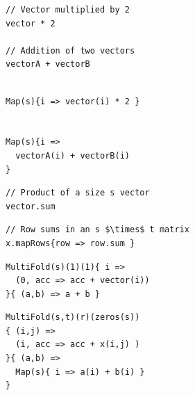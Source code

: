 \begin{figure}
\centering

\newsavebox{\MapHLL}
\begin{lrbox}{\MapHLL}
\begin{lstlisting}[language=PPLTable]
// Vector multiplied by 2
vector * 2

// Addition of two vectors
vectorA + vectorB
\end{lstlisting}
\end{lrbox}

\newsavebox{\MapPPL}
\begin{lrbox}{\MapPPL}
\begin{lstlisting}[language=PPLTable]

Map(s){i => vector(i) * 2 }


Map(s){i =>
  vectorA(i) + vectorB(i)
}
\end{lstlisting}
\end{lrbox}

\newsavebox{\MultiFoldHLLOne}
\begin{lrbox}{\MultiFoldHLLOne}
\begin{lstlisting}[language=PPLTable]
// Product of a size s vector
vector.sum

\end{lstlisting}
\end{lrbox}

\newsavebox{\MultiFoldHLLTwo}
\begin{lrbox}{\MultiFoldHLLTwo}
\begin{lstlisting}[language=PPLTable]
// Row sums in an s $\times$ t matrix
x.mapRows{row => row.sum }

\end{lstlisting}
\end{lrbox}

\newsavebox{\MultiFoldPPLOne}
\begin{lrbox}{\MultiFoldPPLOne}
\begin{lstlisting}[language=PPLTable]
MultiFold(s)(1)(1){ i =>
  (0, acc => acc + vector(i))
}{ (a,b) => a + b }
\end{lstlisting}
\end{lrbox}

\newsavebox{\MultiFoldPPLTwo}
\begin{lrbox}{\MultiFoldPPLTwo}
\begin{lstlisting}[language=PPLTable]
MultiFold(s,t)(r)(zeros(s))
{ (i,j) =>
  (i, acc => acc + x(i,j) )
}{ (a,b) =>
  Map(s){ i => a(i) + b(i) }
}
\end{lstlisting}
\end{lrbox}


\end{figure}
